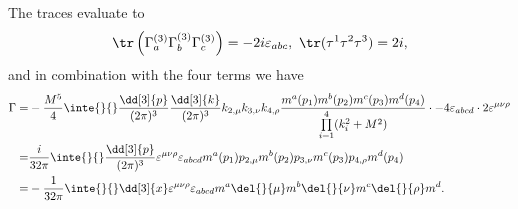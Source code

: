 The traces evaluate to
\begin{align*}
	\tr\left(\Gamma_{a}^{(3)}\Gamma_{b}^{(3)}\Gamma_{c}^{(3)}\right) = -2i\varepsilon_{abc},\ \tr(\tau^{1}\tau^{2}\tau^{3}) = 2i,
\end{align*}
and in combination with the four terms we have
\begin{align*}
	\Gamma =& -\frac{M^{5}}{4}\inte{}{}\frac{\dd[3]{p}}{(2\pi)^{3}}\frac{\dd[3]{k}}{(2\pi)^{3}}k_{2, \mu}k_{3, \nu}k_{4, \rho}\frac{m^{a}(p_{1})m^{b}(p_{2})m^{c}(p_{3})m^{d}(p_{4})}{\prod\limits_{i = 1}^{4}(k_{i}^{2} + M^{2})}\cdot -4\varepsilon_{abcd}\cdot 2\varepsilon^{\mu\nu\rho} \\
	       =& \frac{i}{32\pi}\inte{}{}\frac{\dd[3]{p}}{(2\pi)^{3}}\varepsilon^{\mu\nu\rho}\varepsilon_{abcd}m^{a}(p_{1})p_{2, \mu}m^{b}(p_{2})p_{3, \nu}m^{c}(p_{3})p_{4, \rho}m^{d}(p_{4}) \\
	       =& -\frac{1}{32\pi}\inte{}{}\dd[3]{x}\varepsilon^{\mu\nu\rho}\varepsilon_{abcd}m^{a}\del{}{\mu}m^{b}\del{}{\nu}m^{c}\del{}{\rho}m^{d}.
\end{align*}
